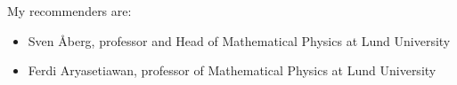 \documentclass[12pt]{article}
\begin{document}
\maketitle

My recommenders are:
\begin{itemize}
\item Sven \AA berg, professor and Head of Mathematical Physics at
  Lund University
\item Ferdi Aryasetiawan, professor of Mathematical Physics at
  Lund University
\end{itemize}
\end{document}

